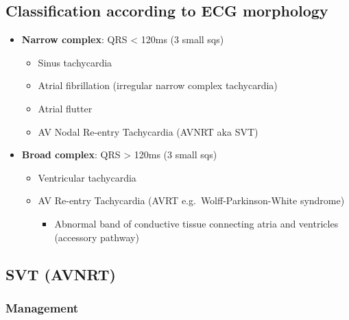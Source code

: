 \documentclass[
  12pt,
]{memoir}
\providecommand{\tightlist}{%
  \setlength{\itemsep}{0pt}\setlength{\parskip}{0pt}}
\begin{document}
\hypertarget{classification-according-to-ecg-morphology}{%
\subsection{Classification according to ECG
morphology}\label{classification-according-to-ecg-morphology}}

\begin{itemize}
\tightlist
\item
  \textbf{Narrow complex}: QRS \textless{} 120ms (3 small sqs)

  \begin{itemize}
  \tightlist
  \item
    Sinus tachycardia
  \item
    Atrial fibrillation (irregular narrow complex tachycardia)
  \item
    Atrial flutter
  \item
    AV Nodal Re-entry Tachycardia (AVNRT aka SVT)
  \end{itemize}
\item
  \textbf{Broad complex}: QRS \textgreater{} 120ms (3 small sqs)

  \begin{itemize}
  \tightlist
  \item
    Ventricular tachycardia
  \item
    AV Re-entry Tachycardia (AVRT e.g.~Wolff-Parkinson-White syndrome)

    \begin{itemize}
    \tightlist
    \item
      Abnormal band of conductive tissue connecting atria and ventricles
      (accessory pathway)
    \end{itemize}
  \end{itemize}
\end{itemize}

\hypertarget{svt-avnrt}{%
\subsection{SVT (AVNRT)}\label{svt-avnrt}}

\hypertarget{management}{%
\subsubsection{Management}\label{management}}
\end{document}

